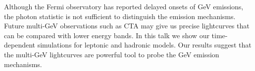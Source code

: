 


\bigskip



\bigskip

\noindent Although the Fermi observatory has reported delayed onsets of GeV emissions, the photon statistic is not sufficient to distinguish the emission mechanisms. Future multi-GeV observations such as CTA may give us precise lightcurves that can be compared with lower energy bands. In this talk we show our time-dependent simulations for leptonic and hadronic models. Our results suggest that the multi-GeV lightcurves are powerful tool to probe the GeV emission mechanisms.

